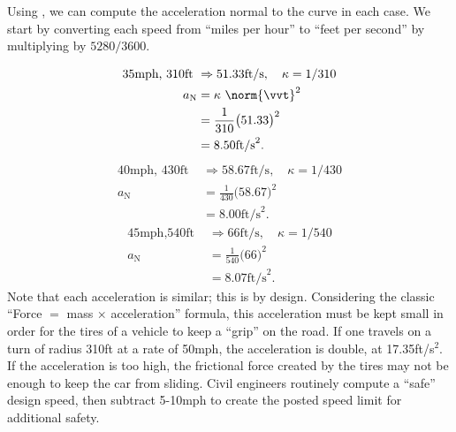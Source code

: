 {
Using , we can compute the acceleration normal to the curve in each case. We start by converting each speed from ``miles per hour'' to ``feet per second'' by multiplying by $5280/3600$.

\begin{align*}
\text{35mph, 310ft } &\Rightarrow 51.33\text{ft/s},\quad \kappa = 1/310 \\
			a_\text{N}&= \kappa\ \norm{\vvt}^2\\ 
							&= \frac1{310}\big(51.33\big)^2 \\
							&= 8.50\text{ft/s}^2.
\end{align*}
\begin{align*}
\text{40mph, 430ft } &\Rightarrow 58.67\text{ft/s},\quad \kappa = 1/430 \\
			a_\text{N}&= \frac1{430}\big(58.67\big)^2 \\
							&= 8.00\text{ft/s}^2.
\end{align*}
\begin{align*}
\text{45mph,540ft } &\Rightarrow 66\text{ft/s},\quad \kappa = 1/540 \\
			a_\text{N}&= \frac1{540}\big(66\big)^2 \\
							&= 8.07\text{ft/s}^2.
\end{align*}
Note that each acceleration is similar; this is by design. Considering the classic ``Force $=$ mass $\times$ acceleration'' formula, this acceleration must be kept small in order for the tires of a vehicle to keep a ``grip'' on the road. If one travels on a turn of radius 310ft at a rate of 50mph, the acceleration is double, at 17.35ft/s$^2$. If the acceleration is too high, the frictional force created by the tires may not be enough to keep the car from sliding. Civil engineers routinely compute a ``safe'' design speed, then subtract 5-10mph to create the posted speed limit for additional safety.}

